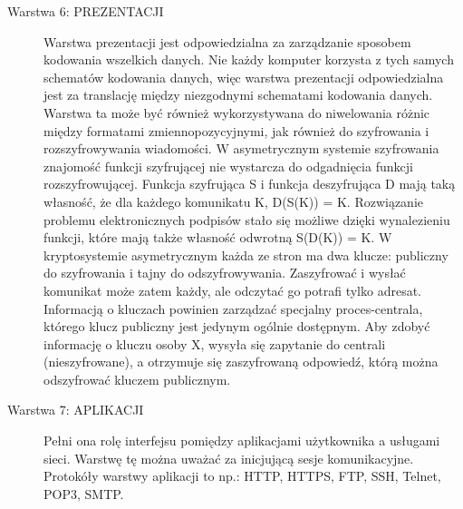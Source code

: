 \documentclass[a4paper,11pt]{article}
\begin{document}
\begin{description}
\item[Warstwa 6: PREZENTACJI] Warstwa prezentacji jest odpowiedzialna za zarządzanie sposobem kodowania wszelkich danych. Nie każdy komputer korzysta z tych samych schematów kodowania danych, więc warstwa prezentacji odpowiedzialna jest za translację między niezgodnymi schematami kodowania danych. Warstwa ta może być również wykorzystywana do niwelowania różnic między formatami zmiennopozycyjnymi, jak również do szyfrowania i rozszyfrowywania wiadomości.  W asymetrycznym systemie szyfrowania znajomość funkcji szyfrującej nie wystarcza do odgadnięcia funkcji rozszyfrowującej. Funkcja szyfrująca S i funkcja deszyfrująca D mają taką własność, że dla każdego komunikatu K, D(S(K)) = K. Rozwiązanie problemu elektronicznych podpisów stało się możliwe dzięki wynalezieniu funkcji, które mają także własność odwrotną S(D(K)) = K. W kryptosystemie asymetrycznym każda ze stron ma dwa klucze: publiczny do szyfrowania i tajny do odszyfrowywania. Zaszyfrować i wysłać komunikat może zatem każdy, ale odczytać go potrafi tylko adresat. Informacją o kluczach powinien zarządzać specjalny proces-centrala, którego klucz publiczny jest jedynym ogólnie dostępnym. Aby zdobyć informację o kluczu osoby X, wysyła się zapytanie do centrali (nieszyfrowane), a otrzymuje się zaszyfrowaną odpowiedź, którą można odszyfrować kluczem publicznym. 

\item[Warstwa 7: APLIKACJI] Pełni ona rolę interfejsu pomiędzy aplikacjami użytkownika a usługami sieci. Warstwę tę można uważać za inicjującą sesje komunikacyjne. Protokóły warstwy aplikacji to np.: HTTP, HTTPS, FTP, SSH, Telnet, POP3, SMTP. 
\end{description}
\end{document}
